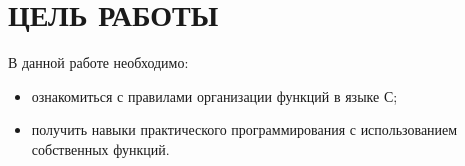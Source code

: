 \section{ЦЕЛЬ РАБОТЫ}

В данной работе необходимо:

\begin{itemize}
\item ознакомиться с правилами организации функций в языке С;
\item получить навыки практического программирования с
  использованием собственных функций.
\end{itemize}

\newpage